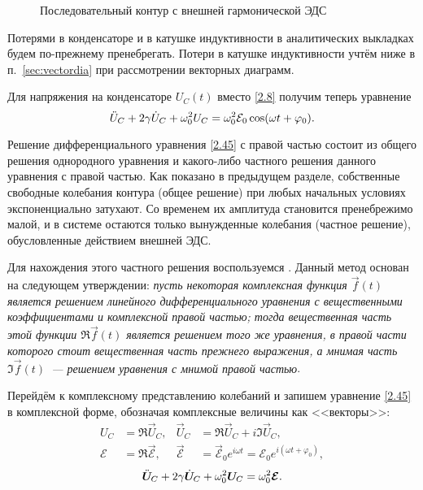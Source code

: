 \begin{wrapfigure}{o}{0.3\textwidth}
	\centering
	\caption{Последовательный контур с внешней гармонической ЭДС}
\end{wrapfigure}

Потерями в конденсаторе и в катушке индуктивности в аналитических выкладках
будем по-прежнему пренебрегать.
Потери в катушке индуктивности учтём ниже в п.~\ref{sec:vectordia} 
при рассмотрении векторных диаграмм.

Для напряжения на конденсаторе $U_C(t)$ вместо \eqref{2.8} получим теперь
уравнение
\begin{equation}\eqmark{2.45}
\ddot{U}_C+2\gamma \dot{U}_C+\omega_0^2U_C=\omega_0^2\mathcal{E}_0\cos(\omega t+
\varphi_0).
\end{equation}


Решение  дифференциального уравнения \eqref{2.45} с правой
частью состоит из общего решения однородного уравнения и какого-либо частного
решения данного уравнения с правой частью. Как показано в предыдущем разделе,
собственные свободные колебания контура (общее решение) при любых начальных
условиях экспоненциально затухают. Со временем их амплитуда становится
пренебрежимо малой, и в системе остаются только вынужденные колебания (частное
решение), обусловленные действием внешней ЭДС. 

Для нахождения этого частного
решения воспользуемся . Данный метод
основан на следующем утверждении: \emph{пусть некоторая комплексная функция
$\vec{f}(t)$ является решением линейного дифференциального уравнения 
с вещественными коэффициентами и комплексной правой частью; 
тогда вещественная часть этой 
функции $\Re \vec{f}(t)$ является решением того же уравнения, 
в правой части которого стоит вещественная часть прежнего выражения, 
а мнимая часть $\Im \vec{f}(t)$~--- решением уравнения с мнимой правой частью}.

Перейдём к комплексному представлению 
колебаний и запишем уравнение \eqref{2.45} в комплексной форме, 
обозначая комплексные величины как <<векторы>>:
\begin{equation}
\begin{aligned}
U_C &= \Re \vec{U}_{\! C}, & \vec{U}_{\! C} &= \Re \vec{U}_{\! C}+i\Im \vec{U}_{\! C}, \\
\mathcal{E}&=\Re \vec{\mathcal{E}}, & \vec{\mathcal{E}}&=
\vec{\mathcal{E}}_0e^{i\omega t}=\mathcal{E}_0 e^{i(\omega t+\varphi_0)},
\end{aligned}
\end{equation}
\begin{equation}\eqmark{2.46}
\ddot{\vec U}_{\! C}+2\gamma\dot{\vec U}_{\! C}+
\omega_0^2 \vec{U}_{\! C}=\omega_0^2\vec{\mathcal{E}}.
\end{equation}

